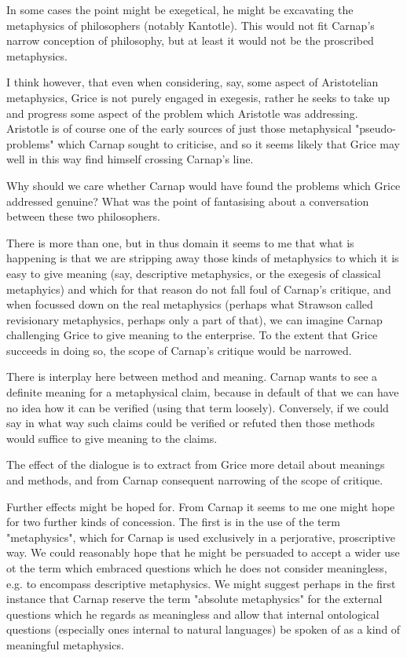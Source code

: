 \documentclass[10pt,titlepage]{book}
\begin{document}
In some cases the point might be exegetical, he might be excavating the metaphysics of philosophers (notably Kantotle).  This would not fit Carnap's narrow conception of philosophy, but at least it would not be the proscribed metaphysics.

I think however, that even when considering, say, some aspect of Aristotelian metaphysics, Grice is not purely engaged in exegesis, rather he seeks to take up and progress some aspect of the problem which Aristotle was addressing.  Aristotle is of course one of the early sources of just those metaphysical "pseudo-problems" which Carnap sought to criticise, and so it seems likely that Grice may well in this way find himself crossing Carnap's line.

Why should we care whether Carnap would have found the problems which Grice addressed genuine?  What was the point of fantasising about a conversation between these two philosophers.

There is more than one, but in thus domain it seems to me that what is happening is that we are stripping away those kinds of metaphysics to which it is easy to give meaning (say, descriptive metaphysics, or the exegesis of classical metaphyics) and which for that reason do not fall foul of Carnap's critique, and when focussed down on the real metaphysics (perhaps what Strawson called revisionary metaphysics, perhaps only a part of that), we can imagine Carnap challenging Grice to give meaning to the enterprise.  To the extent that Grice succeeds in doing so, the scope of Carnap's critique would be narrowed.

There is interplay here between method and meaning.  Carnap wants to see a definite meaning for a metaphysical claim, because in default of that we can have no idea how it can be verified (using that term loosely).  Conversely, if we could say in what way such claims could be verified or refuted then those methods would suffice to give meaning to the claims.

The effect of the dialogue is to extract from Grice more detail about meanings and methods, and from Carnap consequent narrowing of the scope of critique.

Further effects might be hoped for.  From Carnap it seems to me one might hope for two further kinds of concession.  The first is in the use of the term "metaphysics", which for Carnap is used exclusively in a perjorative, proscriptive way.  We could reasonably hope that he might be persuaded to accept a wider use ot the term which embraced questions which he does not consider meaningless, e.g. to encompass descriptive metaphysics.  We might suggest perhaps in the first instance that Carnap reserve the term "absolute metaphysics" for the external questions which he regards as meaningless and allow that internal ontological questions (especially ones internal to natural languages) be spoken of as a kind of meaningful metaphysics.
\end{document}
